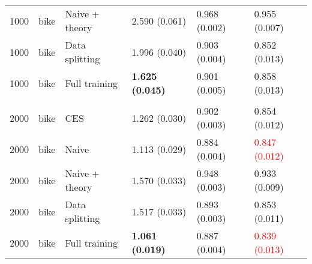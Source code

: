 \begin{tabular}[t]{rlllll}
\hspace{1em}1000 & bike & Naive + theory & 2.590 (0.061) & 0.968 (0.002) & 0.955 (0.007)\\
\hspace{1em}1000 & bike & Data splitting & 1.996 (0.040) & 0.903 (0.004) & 0.852 (0.013)\\
\hspace{1em}1000 & bike & Full training & \textbf{1.625 (0.045)} & 0.901 (0.005) & 0.858 (0.013)\\
\addlinespace[0.3em]
\multicolumn{6}{l}{\textbf{2000}}\\
\hspace{1em}2000 & bike & CES & 1.262 (0.030) & 0.902 (0.003) & 0.854 (0.012)\\
\hspace{1em}2000 & bike & Naive & 1.113 (0.029) & 0.884 (0.004) & \textcolor{red}{0.847 (0.012)}\\
\hspace{1em}2000 & bike & Naive + theory & 1.570 (0.033) & 0.948 (0.003) & 0.933 (0.009)\\
\hspace{1em}2000 & bike & Data splitting & 1.517 (0.033) & 0.893 (0.003) & 0.853 (0.011)\\
\hspace{1em}2000 & bike & Full training & \textbf{1.061 (0.019)} & 0.887 (0.004) & \textcolor{red}{0.839 (0.013)}\\
\bottomrule
\end{tabular}


